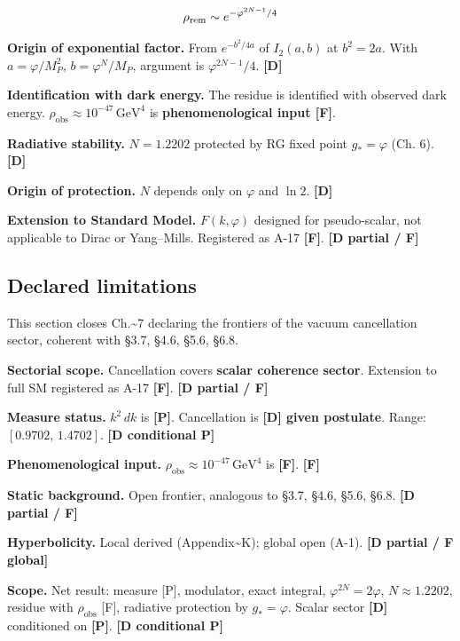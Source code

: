 ﻿\documentclass[11pt,letterpaper]{article}
\begin{document}
\begin{equation*}
  \resizebox{\ifdim\width>\linewidth \linewidth\else\width\fi}{!}{$\displaystyle \rho_{\text{rem}} \sim e^{-\varphi^{2N-1}/4}$}
\end{equation*}

\textbf{Origin of exponential factor.} From $e^{-b^2/4a}$ of $I_2(a, b)$ at $b^2 = 2a$. With $a = \varphi/M_P^2$, $b = \varphi^N/M_P$, argument is $\varphi^{2N-1}/4$. \textbf{[D]}

\textbf{Identification with dark energy.} The residue is identified with observed dark energy. $\rho_{\text{obs}} \approx 10^{-47}\,\text{GeV}^4$ is \textbf{phenomenological input [F]}.

\textbf{Radiative stability.} $N = 1{.}2202$ protected by RG fixed point $g_* = \varphi$ (Ch. 6). \textbf{[D]}

\textbf{Origin of protection.} $N$ depends only on $\varphi$ and $\ln 2$. \textbf{[D]}

\textbf{Extension to Standard Model.} $F(k, \varphi)$ designed for pseudo-scalar, not applicable to Dirac or Yang--Mills. Registered as A-17 \textbf{[F]}. \textbf{[D partial / F]}
\subsection{Declared limitations}
This section closes Ch.\textasciitilde{}7 declaring the frontiers of the vacuum cancellation sector, coherent with §3.7, §4.6, §5.6, §6.8.

\textbf{Sectorial scope.} Cancellation covers \textbf{scalar coherence sector}. Extension to full SM registered as A-17 \textbf{[F]}. \textbf{[D partial / F]}

\textbf{Measure status.} $k^2\,dk$ is \textbf{[P]}. Cancellation is \textbf{[D] given postulate}. Range: $[0{.}9702,\,1{.}4702]$. \textbf{[D conditional P]}

\textbf{Phenomenological input.} $\rho_{\text{obs}} \approx 10^{-47}\,\text{GeV}^4$ is \textbf{[F]}. \textbf{[F]}

\textbf{Static background.} Open frontier, analogous to §3.7, §4.6, §5.6, §6.8. \textbf{[D partial / F]}

\textbf{Hyperbolicity.} Local derived (Appendix\textasciitilde{}K); global open (A-1). \textbf{[D partial / F global]}

\textbf{Scope.} Net result: measure [P], modulator, exact integral, $\varphi^{2N} = 2\varphi$, $N \approx 1{.}2202$, residue with $\rho_{\text{obs}}$ [F], radiative protection by $g_* = \varphi$. Scalar sector \textbf{[D]} conditioned on \textbf{[P]}. \textbf{[D conditional P]}
\end{document}
